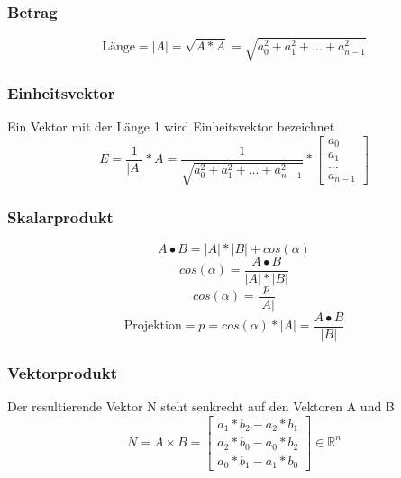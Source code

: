 \documentclass[10pt]{article}
\newcommand{\RN}{\mathbb{R}} %
\begin{document}
\subsubsection{Betrag}
\begin{equation}
	\text{Länge}=|A|=\sqrt{A * A} = \sqrt{a_0^2+a_1^2+\dots+a_{n-1}^2}
\end{equation}
\subsubsection{Einheitsvektor}
Ein Vektor mit der Länge 1 wird Einheitsvektor bezeichnet
\begin{equation}
	E =\frac{1}{|A|} * A = \frac{1}{\sqrt{a_0^2+a_1^2+\dots+a_{n-1}^2}} * 
	\begin{bmatrix}
	a_0 \\ a_1 \\ \dots \\ a_{n-1}
	\end{bmatrix}
\end{equation}
\subsubsection{Skalarprodukt}
\begin{equation}
	A \bullet B = |A| * |B| + cos(\alpha)
\end{equation}
\begin{equation}
	cos(\alpha)=\frac{A \bullet B}{|A| * |B| }
\end{equation}
\begin{equation}
	cos(\alpha)=\frac{p}{|A|}
\end{equation}
\begin{equation}
	\text{Projektion} = p=cos(\alpha) * |A| = \frac{A \bullet B}{|B|}
\end{equation}
\subsubsection{Vektorprodukt}
Der resultierende Vektor N steht senkrecht auf den Vektoren A und B
\begin{equation}
	N= A \times B =
	\begin{bmatrix}
	a_1 * b_2 - a_2 * b_1 \\
	a_2 * b_0 - a_0 * b_2 \\
	a_0 * b_1 - a_1 * b_0
	\end{bmatrix}
	\in \RN^n
\end{equation}
\end{document}
